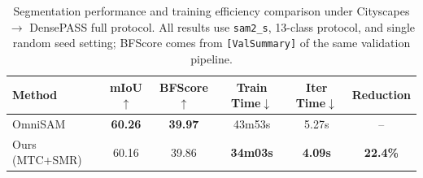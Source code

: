 \begin{table}[t]
  \centering
  \small
  \setlength{\tabcolsep}{4pt}
  \renewcommand{\arraystretch}{1.08}
  \caption{Segmentation performance and training efficiency comparison under Cityscapes $\rightarrow$ DensePASS full protocol. All results use \texttt{sam2\_s}, 13-class protocol, and single random seed setting; BFScore comes from \texttt{[ValSummary]} of the same validation pipeline.}
  \label{tab:main_results}
  \begin{tabular}{lccccc}
    \toprule
    Method & mIoU$\uparrow$ & BFScore$\uparrow$ & Train Time$\downarrow$ & Iter Time$\downarrow$ & Reduction \\
    \midrule
    OmniSAM & \textbf{60.26} & \textbf{39.97} & 43m53s & 5.27s & -- \\
    Ours (MTC+SMR) & 60.16 & 39.86 & \textbf{34m03s} & \textbf{4.09s} & \textbf{22.4\%} \\
    \bottomrule
  \end{tabular}
\end{table}
